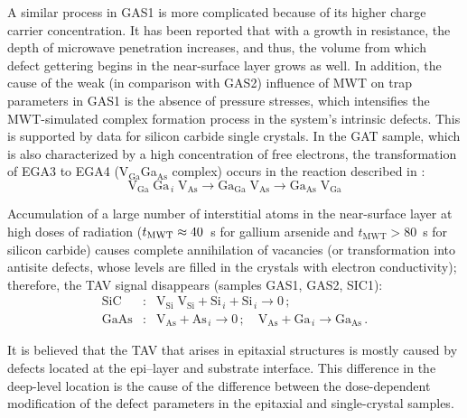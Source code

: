\documentclass[10pt]{iopart}
\begin{document}
A similar process in GAS1 is more complicated because of its higher charge carrier concentration.
It has been reported \cite{ZOHM2000} that with a growth in resistance, the depth of microwave penetration increases,
and thus, the volume from which defect gettering begins in the near-surface layer grows as well.
In addition, the cause of the weak (in comparison with GAS2) influence of MWT on trap parameters in GAS1 is the absence of pressure stresses,
which intensifies the MWT-simulated complex formation process in the system’s intrinsic defects.
This is supported by data for silicon carbide single crystals.
In the GAT sample, which is also characterized by a high concentration of free electrons,
the transformation of EGA3 to EGA4 (V$_\mathrm{Ga}$Ga$_\mathrm{As}$ complex) occurs in the reaction described in \cite{FANG1990}:
\begin{equation*}
  \mathrm{V}_\mathrm{Ga}\;\mathrm{Ga}_{\,i}\;\mathrm{V}_\mathrm{As}\rightarrow \mathrm{Ga}_\mathrm{Ga}\;\mathrm{V}_\mathrm{As}
  \rightarrow \mathrm{Ga}_\mathrm{As}\;\mathrm{V}_\mathrm{Ga}
\end{equation*}

Accumulation of a large number of interstitial atoms in the near-surface layer at high doses of radiation
($t_{\rm MWT}\approx40$~s for gallium arsenide and $t_\mathrm{MWT}>80$~s for silicon carbide)
causes complete annihilation of vacancies (or transformation into antisite defects, whose levels are filled in the crystals with electron conductivity);
 therefore, the TAV signal disappears (samples GAS1, GAS2, SIC1):
\begin{eqnarray}
  \nonumber
  \mathrm{SiC}&:&\mathrm{V}_\mathrm{Si}\;\mathrm{V}_\mathrm{Si}+\mathrm{Si}_{\,i}+ \mathrm{Si}_{\,i} \rightarrow 0\,;\\
  \nonumber
  \mathrm{GaAs}&:&\mathrm{V}_\mathrm{As}+\mathrm{As}_{\,i} \rightarrow 0\,;\quad
  \mathrm{V}_\mathrm{As}+\mathrm{Ga}_{\,i} \rightarrow \mathrm{Ga}_\mathrm{As}\,.
\end{eqnarray}

It is believed \cite{OstrovskiiSST,OlikhSSC,OstrovPAN} that the TAV
that arises in epitaxial structures
is mostly caused by defects located at the epi--layer and substrate interface.
This difference in the deep-level location
is the cause of the difference between the dose-dependent modification of the defect parameters in the epitaxial and single-crystal samples.
\end{document}
